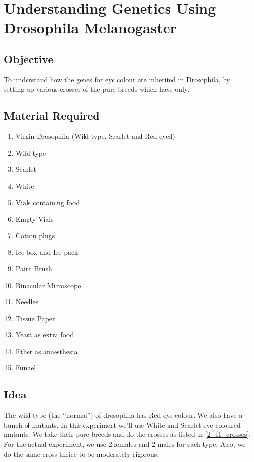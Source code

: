\chapter{Understanding Genetics Using Drosophila Melanogaster}\label{ch:introduction}
\section{Objective}
To understand how the genes for eye colour are inherited in Drosophila, by setting up various crosses of the pure breeds which have only.

\section{Material Required}
	\begin{enumerate}
		\item Virgin Drosophila (Wild type, Scarlet and Red eyed)
		\item Wild type
		\item Scarlet
		\item White
		\item Vials containing food
		\item Empty Vials
		\item Cotton plugs
		\item Ice box and Ice pack
		\item Paint Brush
		\item Binocular Microscope
		\item Needles
		\item Tissue Paper
		\item Yeast as extra food
		\item Ether as anaesthesia
		\item Funnel
	\end{enumerate}

\section{Idea}
	The wild type (the ``normal'') of drosophila has Red eye colour. We also have a bunch of mutants. In this experiment we'll use White and Scarlet eye coloured mutants. We take their pure breeds and do the crosses as listed in \autoref{2_f1_crosses}. For the actual experiment, we use 2 females and 2 males for each type. Also, we do the same cross thrice to be moderately rigorous.

